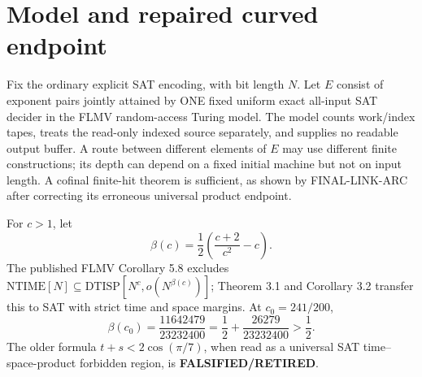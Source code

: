 \documentclass[11pt]{article}
\begin{document}
\section{Model and repaired curved endpoint}
Fix the ordinary explicit SAT encoding, with bit length \(N\). Let \(E\) consist of exponent pairs jointly attained by ONE fixed uniform exact all-input SAT decider in the FLMV random-access Turing model. The model counts work/index tapes, treats the read-only indexed source separately, and supplies no readable output buffer. A route between different elements of \(E\) may use different finite constructions; its depth can depend on a fixed initial machine but not on input length. A cofinal finite-hit theorem is sufficient, as shown by FINAL-LINK-ARC after correcting its erroneous universal product endpoint.

For \(c>1\), let
\[
 \beta(c)=\frac12\left(\frac{c+2}{c^2}-c\right).
\]
The published FLMV Corollary 5.8 excludes \(\mathrm{NTIME}[N]\subseteq \mathrm{DTISP}[N^c,o(N^{\beta(c)})]\); Theorem 3.1 and Corollary 3.2 transfer this to SAT with strict time and space margins. At \(c_0=241/200\),
\[
 \beta(c_0)=\frac{11642479}{23232400}
 =\frac12+\frac{26279}{23232400}>\frac12.
\]
The older formula \(t+s<2\cos(\pi/7)\), when read as a universal SAT time--space-product forbidden region, is \textbf{FALSIFIED/RETIRED}.
\end{document}
